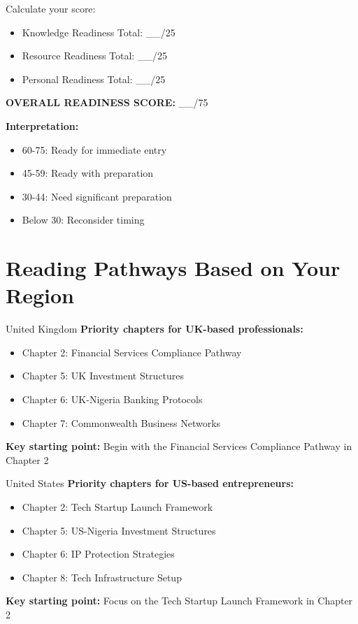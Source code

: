 \begin{workshopbox}
Calculate your score:
\begin{itemize}
    \item Knowledge Readiness Total: \_\_/25
    \item Resource Readiness Total: \_\_/25
    \item Personal Readiness Total: \_\_/25
\end{itemize}

\textbf{OVERALL READINESS SCORE:} \_\_/75

\textbf{Interpretation:}
\begin{itemize}
    \item 60-75: Ready for immediate entry
    \item 45-59: Ready with preparation
    \item 30-44: Need significant preparation
    \item Below 30: Reconsider timing
\end{itemize}
\end{workshopbox}

\section{Reading Pathways Based on Your Region}

\begin{regionalbox}{United Kingdom}
\textbf{Priority chapters for UK-based professionals:}
\begin{itemize}
    \item Chapter 2: Financial Services Compliance Pathway
    \item Chapter 5: UK Investment Structures
    \item Chapter 6: UK-Nigeria Banking Protocols
    \item Chapter 7: Commonwealth Business Networks
\end{itemize}

\textbf{Key starting point:} Begin with the Financial Services Compliance Pathway in Chapter 2
\end{regionalbox}

\begin{regionalbox}{United States}
\textbf{Priority chapters for US-based entrepreneurs:}
\begin{itemize}
    \item Chapter 2: Tech Startup Launch Framework
    \item Chapter 5: US-Nigeria Investment Structures
    \item Chapter 6: IP Protection Strategies
    \item Chapter 8: Tech Infrastructure Setup
\end{itemize}

\textbf{Key starting point:} Focus on the Tech Startup Launch Framework in Chapter 2
\end{regionalbox}

